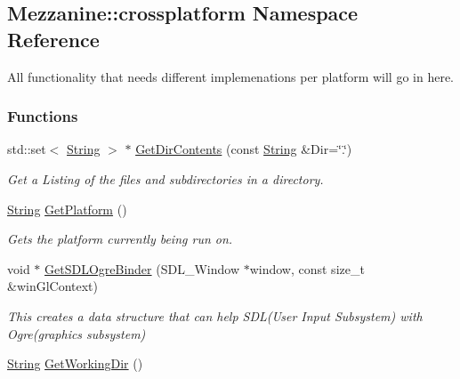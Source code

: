\hypertarget{namespaceMezzanine_1_1crossplatform}{
\subsection{Mezzanine::crossplatform Namespace Reference}
\label{namespaceMezzanine_1_1crossplatform}
}


All functionality that needs different implemenations per platform will go in here.  


\subsubsection*{Functions}
\begin{DoxyCompactItemize}
\item 
std::set$<$ \hyperlink{namespaceMezzanine_acf9fcc130e6ebf08e3d8491aebcf1c86}{String} $>$ $\ast$ \hyperlink{namespaceMezzanine_1_1crossplatform_ac22e9390352c748b7ed557f3e565ee08}{GetDirContents} (const \hyperlink{namespaceMezzanine_acf9fcc130e6ebf08e3d8491aebcf1c86}{String} \&Dir=\char`\"{}.\char`\"{})
\begin{DoxyCompactList}\small\item\em Get a Listing of the files and subdirectories in a directory. \item\end{DoxyCompactList}\item 
\hyperlink{namespaceMezzanine_acf9fcc130e6ebf08e3d8491aebcf1c86}{String} \hyperlink{namespaceMezzanine_1_1crossplatform_a8bd86d58f7ae4a67c31bdd667484a46e}{GetPlatform} ()
\begin{DoxyCompactList}\small\item\em Gets the platform currently being run on. \item\end{DoxyCompactList}\item 
void $\ast$ \hyperlink{namespaceMezzanine_1_1crossplatform_ab5d3ddbc9ef81847b6dff94b3611458c}{GetSDLOgreBinder} (SDL\_\-Window $\ast$window, const size\_\-t \&winGlContext)
\begin{DoxyCompactList}\small\item\em This creates a data structure that can help SDL(User Input Subsystem) with Ogre(graphics subsystem) \item\end{DoxyCompactList}\item 
\hyperlink{namespaceMezzanine_acf9fcc130e6ebf08e3d8491aebcf1c86}{String} \hyperlink{namespaceMezzanine_1_1crossplatform_a9b2c4761a75c8c7dc4bf96a566a5f4b7}{GetWorkingDir} ()

\end{DoxyCompactItemize}
